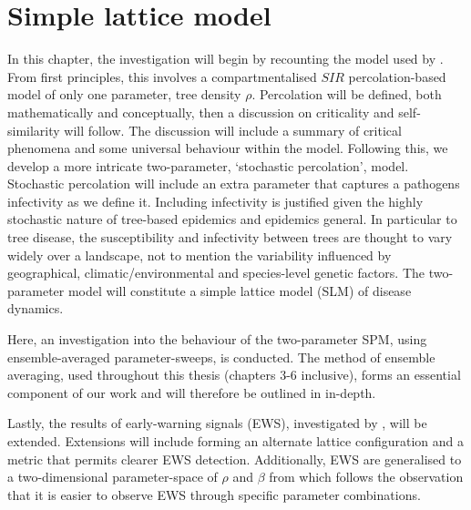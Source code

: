 
\chapter{Simple lattice model}
\label{chapter:SLM}
In this chapter, the investigation will begin by recounting the model used by \cite{OROZCOFUENTES201912}. %
From first principles, this involves a compartmentalised $SIR$ percolation-based model of only one parameter,  tree density $\rho$. %
Percolation will be defined, both mathematically and conceptually, then a discussion on criticality and self-similarity will follow. The discussion will include a summary of critical phenomena and some universal behaviour within the model.  Following this, we develop a more intricate two-parameter, `stochastic percolation', model. Stochastic percolation will include an extra parameter that captures a pathogens infectivity as we define it. Including infectivity is justified given the highly stochastic nature of tree-based epidemics and epidemics general. In particular to tree disease, the susceptibility and infectivity between trees are thought to vary widely over a landscape, not to mention the variability influenced by geographical, climatic/environmental and species-level genetic factors. The two-parameter model will constitute a simple lattice model (SLM) of disease dynamics.

Here, an investigation into the behaviour of the two-parameter SPM, using ensemble-averaged parameter-sweeps, is conducted. The method of ensemble averaging, used throughout this thesis (chapters 3-6 inclusive), forms an essential component of our work and will therefore be outlined in in-depth.

Lastly, the results of early-warning signals (EWS), investigated by \cite{OROZCOFUENTES201912}, will be extended. %
Extensions will include forming an alternate lattice configuration and a metric that permits clearer EWS detection. %
Additionally, EWS are generalised to a two-dimensional parameter-space of $\rho$ and $\beta$ from which follows the observation that it is easier to observe EWS through specific parameter combinations.
\newpage

